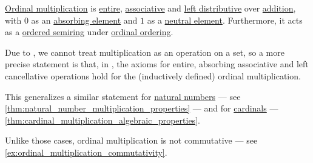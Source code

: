 \begin{proposition}\label{thm:ordinal_multiplication_algebraic_properties}
  \hyperref[def:ordinal_multiplication]{Ordinal multiplication} is \hyperref[def:entire_semiring]{entire}, \hyperref[def:binary_operation/associative]{associative} and \hyperref[def:semiring/theory/axioms/distributivity]{left distributive} over \hyperref[def:ordinal_addition]{addition}, with \( 0 \) as an \hyperref[def:semigroup_absorbing_element]{absorbing element} and \( 1 \) as a \hyperref[def:semigroup_neutral_element]{neutral element}. Furthermore, it acts as a \hyperref[def:ordered_semiring]{ordered semiring} under \hyperref[def:ordinal_ordering]{ordinal ordering}.
\end{proposition}
\begin{comments}
  \item Due to , we cannot treat multiplication as an operation on a set, so a more precise statement is that, in \hyperref[def:zfc]{}, the axioms for entire, absorbing associative and left cancellative operations hold for the (inductively defined) ordinal multiplication.

  \item This generalizes a similar statement for \hyperref[def:natural_numbers]{natural numbers} --- see \cref{thm:natural_number_multiplication_properties} --- and for \hyperref[def:cardinal]{cardinals} --- \cref{thm:cardinal_multiplication_algebraic_properties}.

  Unlike those cases, ordinal multiplication is not commutative --- see \cref{ex:ordinal_multiplication_commutativity}.
\end{comments}
